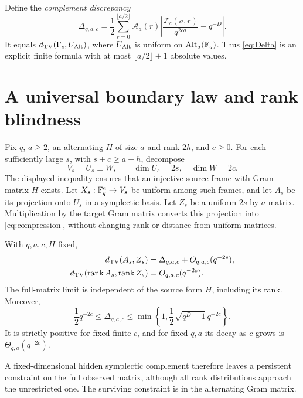 Define the \emph{complement discrepancy}
\begin{equation}\label{eq:Delta}
 \Delta_{q,a,c}
 =\frac12\sum_{r=0}^{\lfloor a/2\rfloor}
 \mathcal A_a(r)
 \left|\frac{\mathcal Z_c(a,r)}{q^{2ca}}-q^{-D}\right|.
\end{equation}
It equals $d_{\mathrm{TV}}(\Gamma_c,U_{\operatorname{Alt}})$, where $U_{\operatorname{Alt}}$ is uniform on
$\operatorname{Alt}_a(\mathbb F_q)$. Thus \eqref{eq:Delta} is an explicit finite formula
with at most $\lfloor a/2\rfloor+1$ absolute values.

\section{A universal boundary law and rank blindness}\label{sec:boundary}

Fix $q$, $a\ge2$, an alternating $H$ of size $a$ and rank $2h$, and
$c\ge0$. For each sufficiently large $s$, with $s+c\ge a-h$, decompose
\[
 V_s=U_s\perp W,\qquad \dim U_s=2s,\quad\dim W=2c.
\]
The displayed inequality ensures that an injective source frame
with Gram matrix $H$ exists.
Let $X_s:\mathbb F_q^a\to V_s$ be uniform among such frames, and let $A_s$
be its projection onto $U_s$ in a symplectic basis.
Let $Z_s$ be a uniform $2s$ by $a$ matrix.
Multiplication by the target Gram matrix converts this projection
into \eqref{eq:compression}, without changing rank or distance from
uniform matrices.

\begin{theorem}\label{thm:boundary}
With $q,a,c,H$ fixed,
\begin{align}
 d_{\mathrm{TV}}(A_s,Z_s)&=\Delta_{q,a,c}+O_{q,a,c}(q^{-2s}),\label{eq:boundary}\\
 d_{\mathrm{TV}}(\operatorname{rank} A_s,\operatorname{rank} Z_s)&=O_{q,a,c}(q^{-2s}).\label{eq:rankblind}
\end{align}
The full-matrix limit is independent of the source form $H$, including
its rank. Moreover,
\begin{equation}\label{eq:Deltabounds}
 \frac12q^{-2c}\le\Delta_{q,a,c}
 \le\min\left\{1,\frac12\sqrt{q^D-1}\,q^{-2c}\right\}.
\end{equation}
It is strictly positive for fixed finite $c$, and for fixed $q,a$
its decay as $c$ grows is $\Theta_{q,a}(q^{-2c})$.
\end{theorem}

A fixed-dimensional hidden symplectic complement therefore leaves
a persistent constraint on the full observed matrix, although all
rank distributions approach the unrestricted one. The surviving
constraint is in the alternating Gram matrix.


